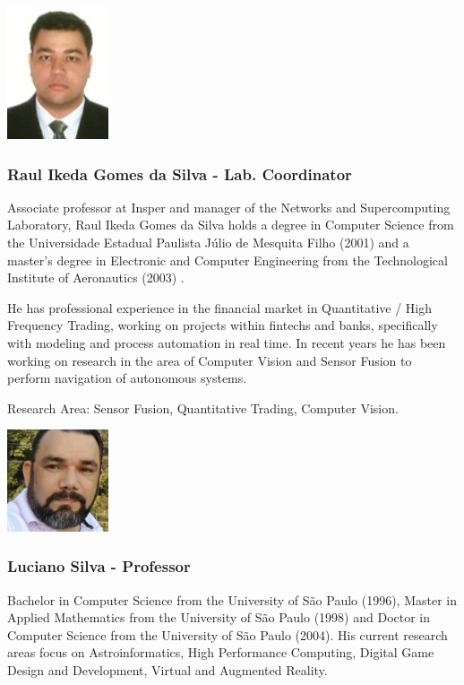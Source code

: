\begin{multicols}{2}
\includegraphics[width=3cm]{imgs/Raul-Ikeda.jpg}
\columnbreak
\subsubsection{Raul Ikeda Gomes da Silva - Lab. Coordinator}

Associate professor at Insper and manager of the Networks and Supercomputing Laboratory, Raul Ikeda Gomes da Silva holds a degree in Computer Science from the Universidade Estadual Paulista Júlio de Mesquita Filho (2001) and a master's degree in Electronic and Computer Engineering from the Technological Institute of Aeronautics (2003) .

He has professional experience in the financial market in Quantitative / High Frequency Trading, working on projects within fintechs and banks, specifically with modeling and process automation in real time. In recent years he has been working on research in the area of Computer Vision and Sensor Fusion to perform navigation of autonomous systems.

Research Area: Sensor Fusion, Quantitative Trading, Computer Vision.

\end{multicols}
\newpage
\begin{multicols}{2}
\includegraphics[width=3cm]{imgs/Luciano-Silva-17.jpg}
\columnbreak
\subsubsection{Luciano Silva - Professor}

Bachelor in Computer Science from the University of São Paulo (1996), Master in Applied Mathematics from the University of São Paulo (1998) and Doctor in Computer Science from the University of São Paulo (2004). His current research areas focus on Astroinformatics, High Performance Computing, Digital Game Design and Development, Virtual and Augmented Reality.

\end{multicols}

